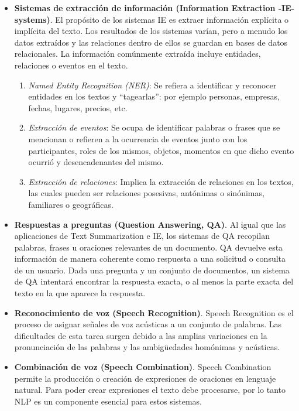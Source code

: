 \documentclass[12pt,a4paper]{article}
\begin{document}
\begin{sloppypar}
\begin{itemize}
\item \textbf{Sistemas de extracción de información (Information Extraction -IE- systems)}. El propósito de los sistemas IE es extraer información explícita o implícita del texto. Los resultados de los sistemas varían, pero a menudo los datos extraídos y las relaciones dentro de ellos se guardan en bases de datos relacionales. La información comúnmente extraída incluye entidades, relaciones o eventos en el texto. 

\begin{enumerate}
\item \textit{Named Entity Recognition (NER)}: Se refiera a identificar y reconocer entidades en los textos y “tagearlas”: por ejemplo personas, empresas, fechas, lugares, precios, etc.
\item \textit{Extracción de eventos}: Se ocupa de identificar palabras o frases que se mencionan o refieren a la ocurrencia de eventos junto con los participantes, roles de los mismos, objetos, momentos en que dicho evento ocurrió y desencadenantes del mismo.
\item \textit{Extracción de relaciones}: Implica la extracción de relaciones en los textos, las cuales pueden ser relaciones posesivas, antónimas o sinónimas, familiares o geográficas.
\end{enumerate}

\item \textbf{Respuestas a preguntas (Question Answering, QA)}. Al igual que las aplicaciones de Text Summarization e IE, los sistemas de QA recopilan palabras, frases u oraciones relevantes de un documento. QA devuelve esta información de manera coherente como respuesta a una solicitud o consulta de un usuario. Dada una pregunta y un conjunto de documentos, un sistema de QA intentará encontrar la respuesta exacta, o al menos la parte exacta del texto en la que aparece la respuesta.

\item \textbf{Reconocimiento de voz (Speech Recognition)}. Speech Recognition es el proceso de asignar señales de voz acústicas a un conjunto de palabras. Las dificultades de esta tarea surgen debido a las amplias variaciones en la pronunciación de las palabras y las ambigüedades homónimas y acústicas.

\item \textbf{Combinación de voz (Speech Combination)}. Speech Combination permite la producción o creación de expresiones de oraciones en lenguaje natural. Para poder crear expresiones el texto debe procesarse, por lo tanto NLP es un componente esencial para estos sistemas.


\end{itemize}
\end{sloppypar}
\end{document}
